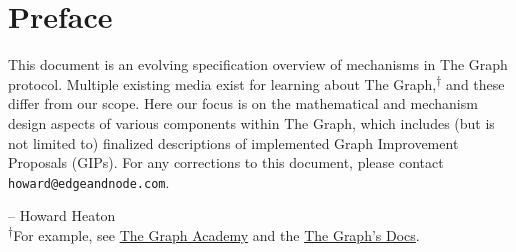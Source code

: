 
\vspace*{1 in}
\section*{Preface}
\vspace*{0.25 in}
\justifying

This document is an evolving specification overview of mechanisms in The Graph protocol. Multiple existing media exist for learning about The Graph,\textsuperscript{$\dagger$} and these differ from our scope. 
Here our focus is on the mathematical and mechanism design aspects of various components within The Graph, which includes (but is not limited to) finalized descriptions of implemented Graph Improvement Proposals (GIPs).
\noindent For any corrections to this document, please contact \verb|howard@edgeandnode.com|.

\hfill -- Howard Heaton \\


\noindent \textsuperscript{$\dagger$}For example, see \href{https://thegraph.academy}{The Graph Academy} and the \href{https://thegraph.com/docs/en/}{The Graph's Docs}.
